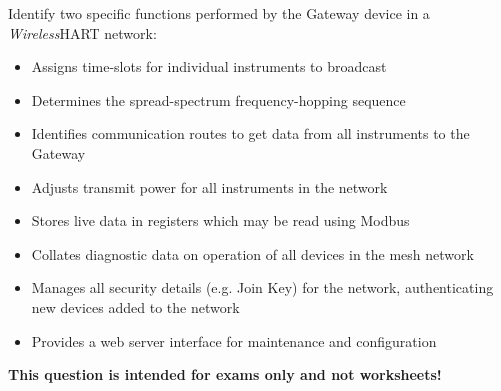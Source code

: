 

Identify two specific functions performed by the Gateway device in a {\sl Wireless}HART network:

\vskip 100pt







\begin{itemize}
\item{} Assigns time-slots for individual instruments to broadcast
\item{} Determines the spread-spectrum frequency-hopping sequence
\item{} Identifies communication routes to get data from all instruments to the Gateway
\item{} Adjusts transmit power for all instruments in the network
\item{} Stores live data in registers which may be read using Modbus
\item{} Collates diagnostic data on operation of all devices in the mesh network
\item{} Manages all security details (e.g. Join Key) for the network, authenticating new devices added to the network
\item{} Provides a web server interface for maintenance and configuration
\end{itemize}







{\bf This question is intended for exams only and not worksheets!}



